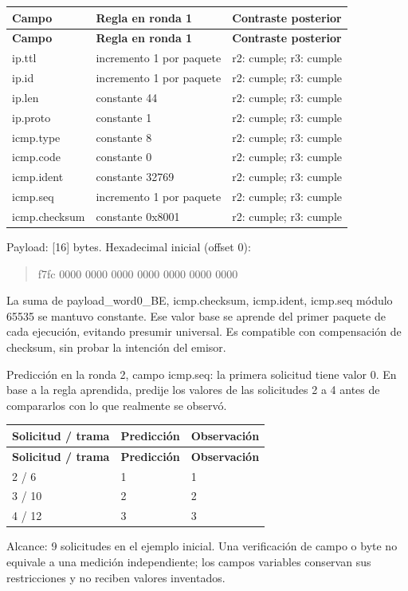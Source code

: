 \begingroup
\fontsize{9}{11}\selectfont
\addtocounter{table}{-1}
\begin{longtable}{p{3.1cm}p{5.8cm}p{5.1cm}}
\toprule
\textbf{Campo} & \textbf{Regla en ronda 1} & \textbf{Contraste posterior} \\ \midrule
\endfirsthead
\toprule
\textbf{Campo} & \textbf{Regla en ronda 1} & \textbf{Contraste posterior} \\ \midrule
\endhead
ip.ttl & incremento 1 por paquete & r2: cumple; r3: cumple \\
ip.id & incremento 1 por paquete & r2: cumple; r3: cumple \\
ip.len & constante 44 & r2: cumple; r3: cumple \\
ip.proto & constante 1 & r2: cumple; r3: cumple \\
icmp.type & constante 8 & r2: cumple; r3: cumple \\
icmp.code & constante 0 & r2: cumple; r3: cumple \\
icmp.ident & constante 32769 & r2: cumple; r3: cumple \\
icmp.seq & incremento 1 por paquete & r2: cumple; r3: cumple \\
icmp.checksum & constante 0x8001 & r2: cumple; r3: cumple \\
\bottomrule
\end{longtable}
\endgroup
Payload: [16] bytes. Hexadecimal inicial (offset 0):

\begin{quote}\ttfamily\footnotesize\raggedright f7fc 0000 0000 0000 0000 0000 0000 0000\end{quote}
La suma de payload\_\allowbreak{}word0\_\allowbreak{}BE, icmp.checksum, icmp.ident, icmp.seq módulo 65535 se mantuvo constante. Ese valor base se aprende del primer paquete de cada ejecución, evitando presumir universal. Es compatible con compensación de checksum, sin probar la intención del emisor.

Predicción en la ronda 2, campo icmp.seq: la primera solicitud tiene valor 0. En base a la regla aprendida, predije los valores de las solicitudes 2 a 4 antes de compararlos con lo que realmente se observó.

\begingroup
\fontsize{9}{11}\selectfont
\addtocounter{table}{-1}
\begin{longtable}{p{3.2cm}p{5.1cm}p{5.1cm}}
\toprule
\textbf{Solicitud / trama} & \textbf{Predicción} & \textbf{Observación} \\ \midrule
\endfirsthead
\toprule
\textbf{Solicitud / trama} & \textbf{Predicción} & \textbf{Observación} \\ \midrule
\endhead
2 / 6 & 1 & 1 \\
3 / 10 & 2 & 2 \\
4 / 12 & 3 & 3 \\
\bottomrule
\end{longtable}
\endgroup
Alcance: 9 solicitudes en el ejemplo inicial. Una verificación de campo o byte no equivale a una medición independiente; los campos variables conservan sus restricciones y no reciben valores inventados.

